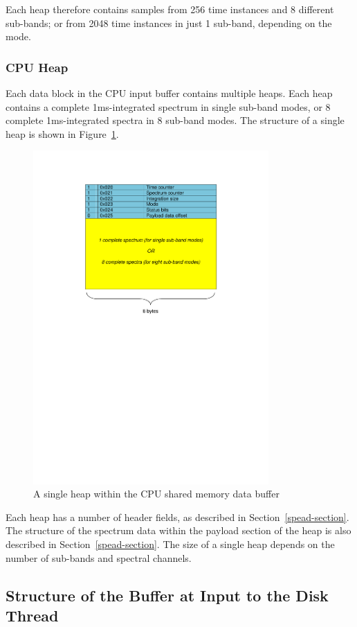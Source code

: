 \documentclass[11pt]{article} %
\begin{document}
Each heap therefore contains samples from 256 time instances and 8 different sub-bands; or from 2048 time instances in just 1 sub-band, depending on the mode.

\subsubsection{CPU Heap}

Each data block in the CPU input buffer contains multiple heaps. Each heap contains a complete 1ms-integrated spectrum in single sub-band modes, or 8 complete 1ms-integrated spectra in 8 sub-band modes. The structure of a single heap is shown in Figure~\ref{vegas-cpu-heap}.

\begin{figure}[!ht]
\centering
\includegraphics*[width=9cm, viewport = 120 420 470 765]{figures/vegas-cpu-heap.pdf}
\caption{A single heap within the CPU shared memory data buffer}
\label{vegas-cpu-heap}
\end{figure}

Each heap has a number of header fields, as described in Section~\ref{spead-section}. The structure of the spectrum data within the payload section of the heap is also described in Section~\ref{spead-section}. The size of a single heap depends on the number of sub-bands and spectral channels.

\subsection{Structure of the Buffer at Input to the Disk Thread}
\end{document}
